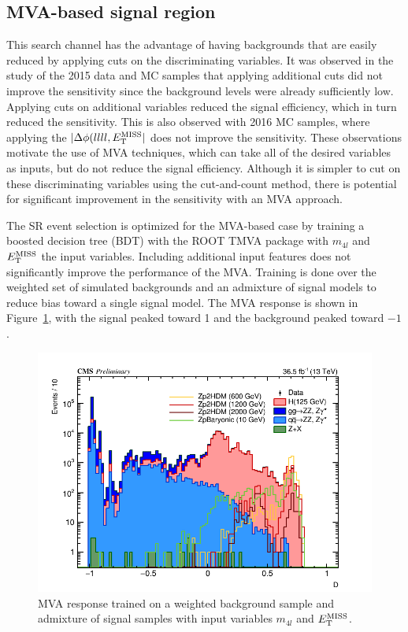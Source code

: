 \subsection{MVA-based signal region} \label{mvaopt}

This search channel has the advantage of having backgrounds that are easily reduced by applying cuts on the discriminating variables. It was observed in the study of the 2015 data and MC samples that applying additional cuts did not improve the sensitivity since the background levels were already sufficiently low. Applying cuts on additional variables reduced the signal efficiency, which in turn reduced the sensitivity. This is also observed with 2016 MC samples, where applying the $|\Delta\phi(llll, E_{\rm{T}}^{\rm{MISS}}|$ does not improve the sensitivity. These observations motivate the use of MVA techniques, which can take all of the desired variables as inputs, but do not reduce the signal efficiency. Although it is simpler to cut on these discriminating variables using the cut-and-count method, there is potential for significant improvement in the sensitivity with an MVA approach.

The SR event selection is optimized for the MVA-based case by training a boosted decision tree (BDT) with the ROOT TMVA package with $m_{4l}$ and $E_{\rm{T}}^{\rm{MISS}}$ the input variables. Including additional input features does not significantly improve the performance of the MVA. Training is done over the weighted set of simulated backgrounds and an admixture of signal models to reduce bias toward a single signal model. The MVA response is shown in Figure~\ref{fig:bdt}, with the signal peaked toward 1 and the background peaked toward $-1$. 

\begin{figure}[tbh]
\centering
\includegraphics[width=5in]{figures/hist_hD_CR.png}
\caption{MVA response trained on a weighted background sample and admixture of signal samples with input variables $m_{4l}$ and $E_{\rm{T}}^{\rm{MISS}}$.}
\label{fig:bdt}
\end{figure}

